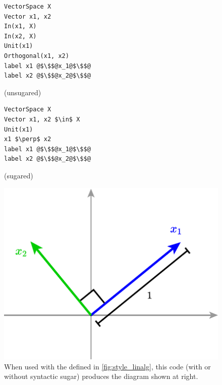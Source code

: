 \begin{figure}
\begin{minipage}[!t]{140pt}
\begin{mdframed}[style=SUBCode]
\begin{lstlisting}[language=Sub-LA,escapechar=@,numbers=none]
VectorSpace X
Vector x1, x2
In(x1, X)
In(x2, X)
Unit(x1)
Orthogonal(x1, x2)
label x1 @$\$$@x_1@$\$$@
label x2 @$\$$@x_2@$\$$@
\end{lstlisting}
\end{mdframed}
\centering (unsugared)
\end{minipage}
\hfill
\begin{minipage}[!t]{150pt}\vspace{-2\baselineskip}
\begin{mdframed}[style=SUBCode]
\begin{lstlisting}[language=Sub-LA,escapechar=@,numbers=none]
VectorSpace X
Vector x1, x2 $\in$ X
Unit(x1)
x1 $\perp$ x2
label x1 @$\$$@x_1@$\$$@
label x2 @$\$$@x_2@$\$$@
\end{lstlisting}
\end{mdframed}
\centering (sugared)
\end{minipage}
\hfill
\begin{minipage}[!t]{150pt}
\includegraphics[width=1\columnwidth]{assets/penrose/substance-linalg.pdf}
\end{minipage}
   \caption{When used with the \Style{} defined in \cref{fig:style_linalg}, this \Substance{} code (with or without syntactic sugar) produces the diagram shown at right.\label{fig:substance_linalg}}
\end{figure}


